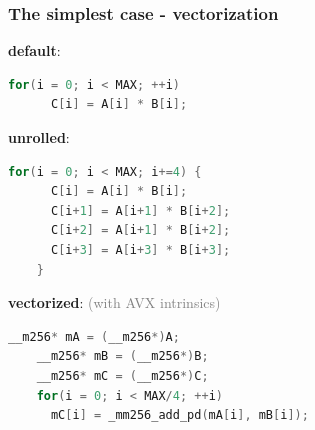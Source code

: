 \documentclass{beamer}
\begin{document}
\begin{frame}[fragile]
  \frametitle{The simplest case - vectorization}
  
  \textbf{default}:
  \begin{lstlisting}[language=C++]
    for(i = 0; i < MAX; ++i) 
      C[i] = A[i] * B[i];   
  \end{lstlisting}
  
  \textbf{unrolled}:
  \begin{lstlisting}[language=C++]
    for(i = 0; i < MAX; i+=4) {
      C[i] = A[i] * B[i];
      C[i+1] = A[i+1] * B[i+2];
      C[i+2] = A[i+1] * B[i+2];
      C[i+3] = A[i+3] * B[i+3];
    }
  \end{lstlisting}
  
  \textbf{vectorized}: \textcolor{gray}{(with AVX intrinsics)}
  \begin{lstlisting}[language=C++]
    __m256* mA = (__m256*)A;
    __m256* mB = (__m256*)B;
    __m256* mC = (__m256*)C;
    for(i = 0; i < MAX/4; ++i) 
      mC[i] = _mm256_add_pd(mA[i], mB[i]);
  \end{lstlisting}
  
\end{frame}
\end{document}
